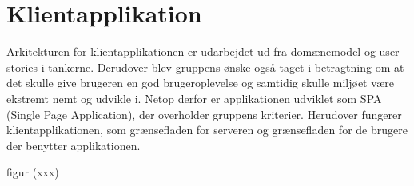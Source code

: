 \section{Klientapplikation}

Arkitekturen for klientapplikationen er udarbejdet ud fra domænemodel og user stories i tankerne. Derudover blev gruppens ønske også taget i betragtning om at det skulle give brugeren en god brugeroplevelse og samtidig skulle miljøet være ekstremt nemt og udvikle i. Netop derfor er applikationen udviklet som SPA (Single Page Application), der overholder gruppens kriterier. Herudover fungerer klientapplikationen, som grænsefladen for serveren og grænsefladen for de brugere der benytter applikationen.

figur (xxx)